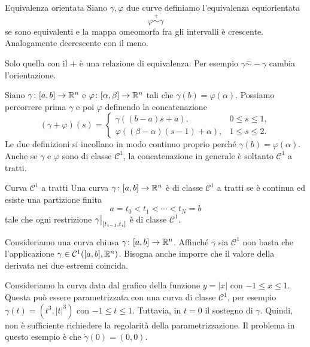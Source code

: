 \documentclass[a4paper]{article}
\begin{document}
\begin{snippetdefinition}{Equivalenza orientata}
    Siano \(\gamma, \varphi\) due curve
    definiamo l'equivalenza equiorientata
    \[
        \varphi \overset+\sim \gamma
    \]
    se sono equivalenti e la mappa omeomorfa fra gli intervalli è crescente.
    Analogamente decrescente con il meno.
\end{snippetdefinition}

Solo quella con il \(+\) è una relazione di equivalenza.
Per esempio \(\gamma \overset-\sim -\gamma\) cambia l'orientazione.

Siano \(\gamma\colon[a,b]\to\mathbb{R}^n\) e
\(\varphi\colon[\alpha,\beta]\to\mathbb{R}^n\) tali che \(\gamma(b)=\varphi(\alpha)\).
Possiamo percorrere prima \(\gamma\) e poi \(\varphi\) definendo la concatenazione
\[
    (\gamma+\varphi)(s)=
    \begin{cases}
        \gamma((b-a)s+a), & 0\leq s\leq1,\\
        \varphi((\beta-\alpha)(s-1)+\alpha), & 1\leq s\leq2.
    \end{cases}
\]
Le due definizioni si incollano in modo continuo proprio perché \(\gamma(b)=\varphi(\alpha)\).
Anche se \(\gamma\) e \(\varphi\) sono di classe \(\mathcal{C}^1\), la concatenazione
in generale è soltanto \(\mathcal{C}^1\) a tratti.

\begin{snippetdefinition}{Curva \(\mathcal{C}^1\) a tratti}
    Una curva \(\gamma\colon[a,b]\to\mathbb{R}^n\) è di classe \(\mathcal{C}^1\) a tratti se è continua
    ed esiste una partizione finita
    \[
        a=t_0<t_1<\cdots<t_N=b
    \]
    tale che ogni restrizione \(\restr{\gamma}{[t_{i-1},t_i]}\) è di classe \(\mathcal{C}^1\).
\end{snippetdefinition}

Consideriamo una curva chiusa \(\gamma \colon [a,b] \to \mathbb{R}^n\).
Affinché \(\gamma\) sia \(\mathcal{C}^1\) non basta che
l'applicazione \(\gamma \in \mathcal{C}^1([a,b], \mathbb{R}^n)\).
Bisogna anche imporre che il valore della derivata nei due estremi coincida.

\begin{snippetexample}{}
    Consideriamo la curva data dal grafico della funzione \(y = |x|\)
    con \(-1 \leq x \leq 1\).
    Questa può essere parametrizzata con una curva di classe \(\mathcal{C}^1\),
    per esempio \(\gamma(t) = (t^3, |t|^3)\) con \(-1 \leq t \leq 1\).
    Tuttavia, in \(t=0\) il sostegno di \(\gamma\).
    Quindi, non è sufficiente richiedere la regolarità della parametrizzazione.
    Il problema in questo esempio è che \(\dot\gamma(0) = (0,0)\).
\end{snippetexample}
\end{document}
